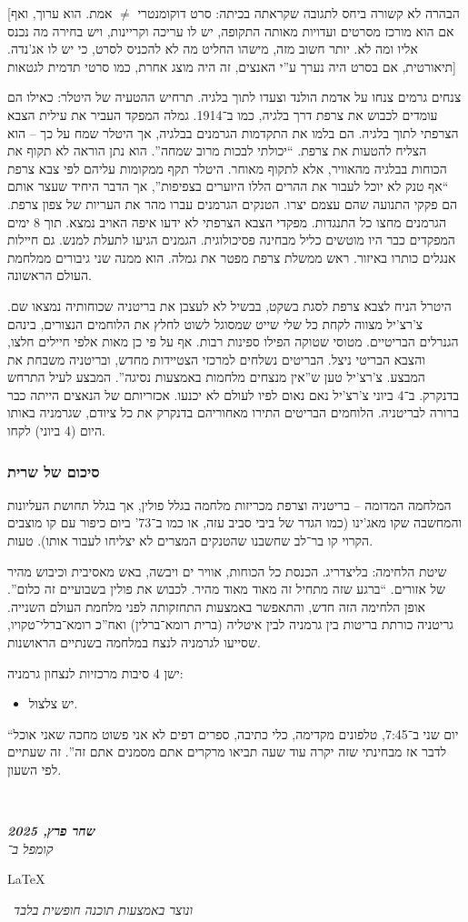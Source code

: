 \documentclass[]{article}
\newcommand\en[1] {\begin{otherlanguage}{english}#1\end{otherlanguage}}
\newcommand\ndoc  {\dotfill \\ \vfil {\begin{center}
            {\textbf{\textit{שחר פרץ, 2025}} \\
                \scriptsize \textit{קומפל ב־}\en{\LaTeX}\,\textit{ ונוצר באמצעות תוכנה חופשית בלבד}}
    \end{center}} \vfil	}
\begin{document}
   [הבהרה לא קשורה ביחס לתגובה שקראתה בכיתה: סרט דוקומנטרי $\neq$ אמת. הוא ערוך, ואף אם הוא מורכז מסרטים ועדויות מאותה התקופה, יש לו עריכה וקריינות, ויש בחירה מה נכנס אליו ומה לא. יותר חשוב מזה, מישהו החליט מה לא להכניס לסרט, כי יש לו אג'נדה. תיאורטית, אם בסרט היה נערך ע''י האנצים, זה היה מוצג אחרת, כמו סרטי תדמית לגטאות]
   
   צנחים גרמים צנחו על אדמת הולנד וצעדו לתוך בלגיה. תרחיש ההטעיה של היטלר: כאילו הם עומדים לכבוש את צרפת דרך בלגיה, כמו ב־1914. גמלה המפקד העביר את עילית הצבא הצרפתי לתוך בלגיה. הם בלמו את התקדמות הגרמנים בבלגיה, אך היטלר שמח על כך – הוא הצליח להטעות את צרפת. ``יכולתי לבכות מרוב שמחה''. הוא נתן הוראה לא תקוף את הכוחות בבלגיה מהאוויר, אלא לתקוף מאוחר. היטלר תקף ממקומות עליהם לפי צבא צרפת ``אף טנק לא יוכל לעבור את ההרים הללו היוערים בצפיפות'', אך הדבר היחיד שעצר אותם הם פקקי התנועה שהם עצמם יצרו. הטנקים הגרמנים עברו מהר את העריות של צפון צרפת. הגרמנים מחצו כל התנגדות. מפקדי הצבא הצרפתי לא ידעו איפה האויב נמצא. תוך 8 ימים המפקדים כבר היו מוטשים כליל מבחינה פסיכולוגית. הגמנים הגיעו לתעלת למנש. גם חיילות אנגלים כותרו באיזור. ראש ממשלת צרפת מפטר את גמלה. הוא ממנה שני גיבורים ממלחמת העולם הראשונה.
   
   היטרל הניח לצבא צרפת לסגת בשקט, בבשיל לא לעצבן את בריטניה שכוחותיה נמצאו שם. צ'רצ'יל מצווה לקחת כל שלי שייט שמסוגל לשוט לחלץ את הלוחמים הנצורים, בינהם הגנרלים הבריטיים. מטוסי שטוקה הפילו ספינות רבות. אף על פי כן מאות אלפי חיילים חלצו, והצבא הבריטי ניצל. הבריטים נשלחים למרכזי הצטיידות מחדש, ובריטניה משבחת את המבצע. צ'רצ'יל טען ש''אין מנצחים מלחמות באמצעות נסיגה''. המבצע לעיל התרחש בדנקרק. ב־4 ביוני צ'רצ'יל נאם נאום לפיו לעולם לא יכנעו. אכזריותם של הנאצים הייתה כבר ברורה לבריטניה. הלוחמים הבריטים התירו מאחוריהם בדנקרק את כל ציודם, שגרמניה באותו היום (4 ביוני) לקחו. 
    
    \subsubsection{סיכום של שרית}
    המלחמה המדומה – בריטניה וצרפת מכריזות מלחמה בגלל פולין, אך בגלל תחושת העליונות והמחשבה שקו מאג'ינו (כמו הגדר של ביבי סביב עזה, או כמו ב־73' ביום כיפור עם קו מוצבים הקרוי קו בר־לב שחשבנו שהטנקים המצרים לא יצליחו לעבור אותו). טעות. 
    
    שיטת הלחימה: בליצדריג. הכנסת כל הכוחות, אוויר ים ויבשה, באש מאסיבית וכיבוש מהיר של אזורים. ``ברגע שזה מתחיל זה מאוד מאוד מהיר. לכבוש את פולין בשבועיים זה כלום''. אופן הלחימה הזה חדש, והתאפשר באמצעות התחזקותה לפני מלחמת העולם השנייה. גריטניה כורתת בריטות בין גרמניה לבין איטליה (ברית רומא־ברלין) ואח''כ רומא־ברלי־טקויו, שסייעו לגרמניה לנצח במלחמה בשנתיים הראושנות. 
    
    ישן 4 סיבות מרכזיות לנצחון גרמניה: 
    \begin{itemize}
        \item יש צלצול. 
    \end{itemize}
    
    ``יום שני ב־7:45, טלפונים מקדימה, כלי כתיבה, ספרים דפים לא אני פשוט מחכה שאני אוכל לדבר אז מבחינתי שזה יקרה עוד שעה תביאו מרקרים אתם מסמנים אתם זה''. זה שעתיים לפי השעון. 
    
    
    \ndoc
\end{document}
